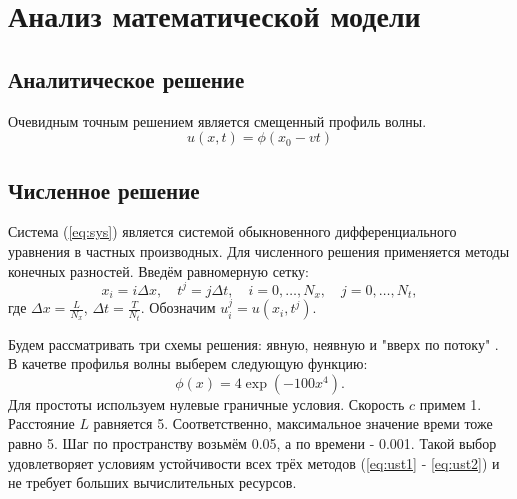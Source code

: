 \chapter{Анализ математической модели}
\section{Аналитическое решение}
Очевидным точным решением является смещенный профиль волны.
\[
	u(x,t) = \phi(x_{0} - vt)
\]

\section{Численное решение}
Система (\ref{eq:sys}) является системой обыкновенного дифференциального уравнения в частных производных.
Для численного решения применяется методы конечных разностей\cite{Turchak2003}. Введём равномерную сетку:
\[
x_i = i \Delta x, \quad t^j = j \Delta t, \quad i = 0, \dots, N_x, \quad j = 0, \dots, N_t,
\]
где $\Delta x = \frac{L}{N_x}$, $\Delta t = \frac{T}{N_t}$. Обозначим $u_i^j = u(x_i, t^j)$.

Будем рассматривать три схемы решения: явную\cite{Turchak2003}, неявную\cite{Turchak2003} и "вверх по потоку" \cite{Patankar1984}.
В качетве профилья волны выберем следующую функцию:
\[
	\phi(x) = 4\exp(-100 x^4).
\]
Для простоты используем нулевые граничные условия. 
Скорость $c$ примем 1. Расстояние $L$ равняется 5. Соответственно, максимальное значение времи тоже равно 5.
Шаг по пространству возьмём 0.05, а по времени - 0.001. Такой выбор удовлетворяет условиям устойчивости всех трёх методов (\ref{eq:ust1} - \ref{eq:ust2}) и не требует больших вычислительных ресурсов.





